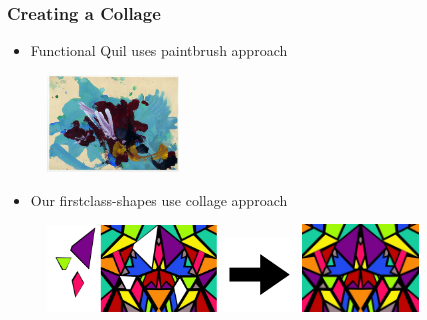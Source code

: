 \documentclass{beamer}
\begin{document}
\begin{frame}
\frametitle{Creating a Collage}
	\begin{itemize}
		\item Functional Quil uses paintbrush approach
	\end{itemize}
	\begin{figure}
	\includegraphics[width=3.5cm]{PresentationImages/painting.jpg}
	\end{figure}
	\begin{itemize}
		\item Our firstclass-shapes use collage approach
	\end{itemize}
	\begin{figure}
	\hspace{-1cm}
	\includegraphics[width=4.5cm]{PresentationImages/collage2.pdf}
	\includegraphics[width=2cm]{PresentationImages/blackArrow.png}
	\includegraphics[width=3.1cm]{PresentationImages/collage.jpg}
	\end{figure}
\end{frame}
\end{document}
